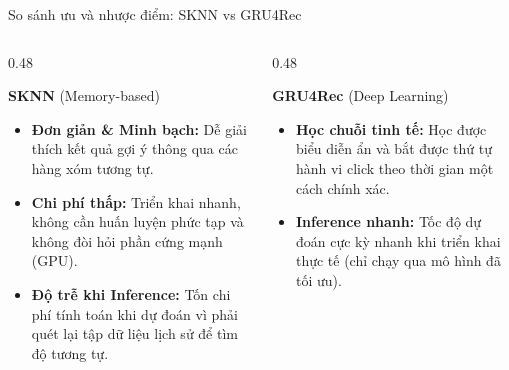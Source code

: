 \documentclass[aspectratio=169, 11pt]{beamer}
\begin{document}
\begin{frame}{So sánh ưu và nhược điểm: SKNN vs GRU4Rec}
    \vspace{-0.35cm}
    \begin{columns}[t] %

        \begin{column}{0.48\textwidth}
            \begin{block}{\textbf{SKNN} (Memory-based)}
                \footnotesize
                \textbf{\color{green!50!black}{Ưu điểm:}}
                \begin{itemize}
                    \item \textbf{Đơn giản \& Minh bạch:} Dễ giải thích kết quả gợi ý thông qua các hàng xóm tương tự.
                    \item \textbf{Chi phí thấp:} Triển khai nhanh, không cần huấn luyện phức tạp và không đòi hỏi phần cứng mạnh (GPU).
                \end{itemize}

                \vspace{0.05cm}
                \textbf{\color{red!70!black}{Nhược điểm:}}
                \begin{itemize}
                    \item \textbf{Độ trễ khi Inference:} Tốn chi phí tính toán khi dự đoán vì phải quét lại tập dữ liệu lịch sử để tìm độ tương tự.
                \end{itemize}
            \end{block}
        \end{column}

        \begin{column}{0.48\textwidth}
            \begin{block}{\textbf{GRU4Rec} (Deep Learning)}
                \footnotesize
                \textbf{\color{green!50!black}{Ưu điểm:}}
                \begin{itemize}
                    \item \textbf{Học chuỗi tinh tế:} Học được biểu diễn ẩn và bắt được thứ tự hành vi click theo thời gian một cách chính xác.
                    \item \textbf{Inference nhanh:} Tốc độ dự đoán cực kỳ nhanh khi triển khai thực tế (chỉ chạy qua mô hình đã tối ưu).
                \end{itemize}


\end{block}
\end{column}
\end{columns}
\end{frame}
\end{document}
